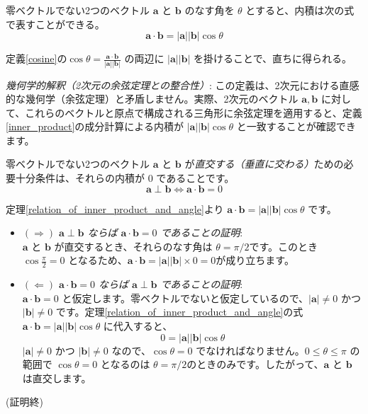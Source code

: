 \begin{thm}[内積とベクトルのなす角の関係] \label{relation_of_inner_product_and_angle}
零ベクトルでない2つのベクトル $\bm{a}$ と $\bm{b}$ のなす角を $\theta$ とすると、内積は次の式で表すことができる。
\[\bm{a} \cdot \bm{b} = |\bm{a}| |\bm{b}| \cos\theta\]
\begin{proof*}
定義\ref{cosine}の$\cos\theta = \frac{\bm{a} \cdot \bm{b}}{|\bm{a}| |\bm{b}|}$ の両辺に $|\bm{a}| |\bm{b}|$ を掛けることで、直ちに得られる。
\end{proof*}
\end{thm}

\emph{幾何学的解釈（2次元の余弦定理との整合性）}: この定義は、2次元における直感的な幾何学（余弦定理）と矛盾しません。実際、2次元のベクトル $\bm{a}, \bm{b}$ に対して、これらのベクトルと原点で構成される三角形に余弦定理を適用すると、定義\ref{inner_product}の成分計算による内積が $|\bm{a}||\bm{b}|\cos\theta$ と一致することが確認できます。

\begin{thm}[ベクトルの直交条件] \label{orthogonality_condition}
零ベクトルでない2つのベクトル $\bm{a}$ と $\bm{b}$ が\emph{直交する（垂直に交わる）}ための必要十分条件は、それらの内積が $0$ であることです。
\[\bm{a} \perp \bm{b} \iff \bm{a} \cdot \bm{b} = 0\]
\begin{proof*}
定理\ref{relation_of_inner_product_and_angle}より $\bm{a} \cdot \bm{b} = |\bm{a}| |\bm{b}| \cos\theta$ です。
\begin{itemize}
\item \emph{$(\Rightarrow)$ $\bm{a} \perp \bm{b}$ ならば $\bm{a} \cdot \bm{b} = 0$ であることの証明}:\\
    $\bm{a}$ と $\bm{b}$ が直交するとき、それらのなす角は $\theta = \pi/2$です。このとき $\cos\frac{\pi}{2} = 0$ となるため、$\bm{a} \cdot \bm{b} = |\bm{a}| |\bm{b}| \times 0 = 0$が成り立ちます。
\item \emph{$(\Leftarrow)$ $\bm{a} \cdot \bm{b} = 0$ ならば $\bm{a} \perp \bm{b}$ であることの証明}:\\
    $\bm{a} \cdot \bm{b} = 0$ と仮定します。零ベクトルでないと仮定しているので、$|\bm{a}| \neq 0$ かつ $|\bm{b}| \neq 0$ です。定理\ref{relation_of_inner_product_and_angle}の式 $\bm{a} \cdot \bm{b} = |\bm{a}| |\bm{b}| \cos\theta$ に代入すると、
    \[0 = |\bm{a}| |\bm{b}| \cos\theta\]
    $|\bm{a}| \neq 0$ かつ $|\bm{b}| \neq 0$ なので、$\cos\theta = 0$ でなければなりません。$0 \le \theta \le \pi$ の範囲で $\cos\theta = 0$ となるのは $\theta = \pi/2$のときのみです。したがって、$\bm{a}$ と $\bm{b}$ は直交します。
\end{itemize}
(証明終)
\end{proof*}
\end{thm}

